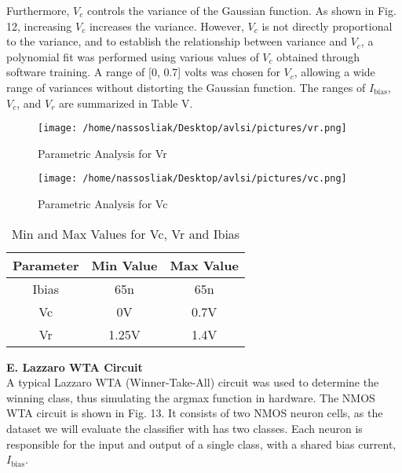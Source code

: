 \documentclass[conference]{IEEEtran}
\begin{document}
Furthermore, \( V_c \) controls the variance of the Gaussian function. As shown in Fig. 12, increasing \( V_c \) increases the variance. However, \( V_c \) is not directly proportional to the variance, and to establish the relationship between variance and \( V_c \), a polynomial fit was performed using various values of \( V_c \) obtained through software training. A range of [0, 0.7] volts was chosen for \( V_c \), allowing a wide range of variances without distorting the Gaussian function. The ranges of \( I_{\text{bias}} \), \( V_c \), and \( V_r \) are summarized in Table V.\\


\begin{figure}[!h]
    \centering
    \texttt{[image: /home/nassosliak/Desktop/avlsi/pictures/vr.png]}
    \caption{Parametric Analysis for Vr}
    \label{fig:vr}
\end{figure}

\begin{figure}[!h]
    \centering
    \texttt{[image: /home/nassosliak/Desktop/avlsi/pictures/vc.png]}
    \caption{Parametric Analysis for Vc}
    \label{fig:vc}
\end{figure}


\begin{table}[!h]
    \centering
\large
    \begin{tabular}{|c|c|c|}
        \hline
        \textbf{Parameter} & \textbf{Min Value} & \textbf{Max Value} \\
        \hline
        Ibias   & 65n  & 65n \\
        \hline
        Vc   &  0V & 0.7V\\
        \hline
       Vr   & 1.25V & 1.4V\\
        \hline
    \end{tabular}
\vspace{0.5cm}
    \caption{Min and Max Values for Vc, Vr and Ibias}
    \label{tab:minmax}
\end{table}

\textbf{E. Lazzaro WTA Circuit}\\
A typical Lazzaro WTA (Winner-Take-All) circuit \cite{1902a535184f48ed963e5033af04007b} was used to determine the winning class, thus simulating the argmax function in hardware. The NMOS WTA circuit is shown in Fig. 13. It consists of two NMOS neuron cells, as the dataset we will evaluate the classifier with has two classes. Each neuron is responsible for the input and output of a single class, with a shared bias current, \( I_{\text{bias}} \). 
\end{document}
